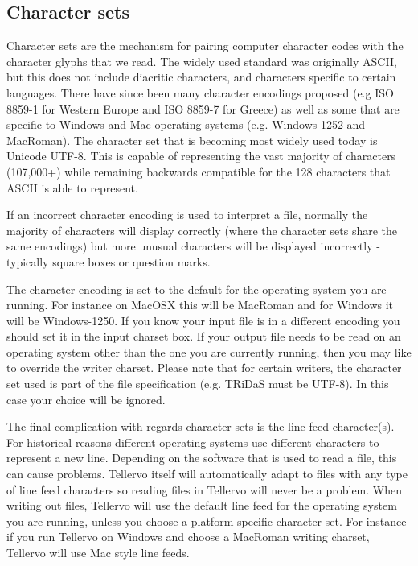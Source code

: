 \subsection{Character sets}
\label{txt:characterSets}
Character sets are the
mechanism for pairing computer character codes with the character glyphs that we read. The widely
used standard was originally ASCII, but this does not include diacritic characters, and characters specific
to certain languages. There have since been many character encodings proposed (e.g ISO 8859-1 for
Western Europe and ISO 8859-7 for Greece) as well as some that are specific to Windows and Mac
operating systems (e.g. Windows-1252 and MacRoman). The character set that is becoming most widely
used today is Unicode UTF-8. This is capable of representing the vast majority of characters (107,000+) while remaining
backwards compatible for the 128 characters that ASCII is able to represent.

If an incorrect character encoding is used to interpret a file, normally the majority of characters will display
correctly (where the character sets share the same encodings) but more unusual characters will be displayed
incorrectly - typically square boxes or question marks.

The character encoding is set to the default for the operating system you are running. For instance on
MacOSX this will be MacRoman and for Windows it will be Windows-1250. If you know your input file
is in a different encoding you should set it in the input charset box. If your output file needs to be read
on an operating system other than the one you are currently running, then you may like to override the
writer charset. Please note that for certain writers, the character set used is part of the file specification
(e.g. TRiDaS must be UTF-8). In this case your choice will be ignored.

The final complication with regards character sets is the line feed character(s). For historical reasons
different operating systems use different characters to represent a new line. Depending on the software
that is used to read a file, this can cause problems. Tellervo itself will automatically adapt to files with
any type of line feed characters so reading files in Tellervo will never be a problem. When writing
out files, Tellervo will use the default line feed for the operating system you are running, unless you
choose a platform specific character set. For instance if you run Tellervo on Windows and choose a
MacRoman writing charset, Tellervo will use Mac style line feeds.


